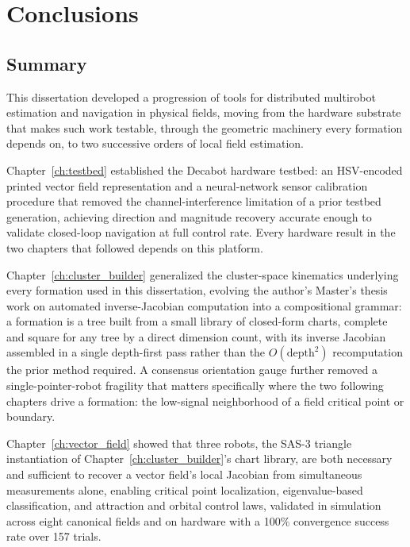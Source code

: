 \documentclass[12pt, letterpaper, oneside]{report}
\begin{document}
\chapter{Conclusions}
\label{ch:conclusions}

\section{Summary}

This dissertation developed a progression of tools for distributed
multirobot estimation and navigation in physical fields, moving from
the hardware substrate that makes such work testable, through the
geometric machinery every formation depends on, to two successive
orders of local field estimation.

Chapter~\ref{ch:testbed} established the Decabot hardware testbed: an
HSV-encoded printed vector field representation and a neural-network
sensor calibration procedure that removed the channel-interference
limitation of a prior testbed generation, achieving direction and
magnitude recovery accurate enough to validate closed-loop navigation
at full control rate. Every hardware result in the two chapters that
followed depends on this platform.

Chapter~\ref{ch:cluster_builder} generalized the cluster-space
kinematics underlying every formation used in this dissertation,
evolving the author's Master's thesis work on automated inverse-Jacobian
computation into a compositional grammar: a formation is a tree built
from a small library of closed-form charts, complete and square for any
tree by a direct dimension count, with its inverse Jacobian assembled in
a single depth-first pass rather than the $O(\text{depth}^2)$
recomputation the prior method required. A consensus orientation gauge
further removed a single-pointer-robot fragility that matters
specifically where the two following chapters drive a formation: the
low-signal neighborhood of a field critical point or boundary.

Chapter~\ref{ch:vector_field} showed that three robots, the SAS-3
triangle instantiation of Chapter~\ref{ch:cluster_builder}'s chart
library, are both necessary and sufficient to recover a vector field's
local Jacobian from simultaneous measurements alone, enabling critical
point localization, eigenvalue-based classification, and attraction and
orbital control laws, validated in simulation across eight canonical
fields and on hardware with a 100\% convergence success rate over 157
trials.
\end{document}
